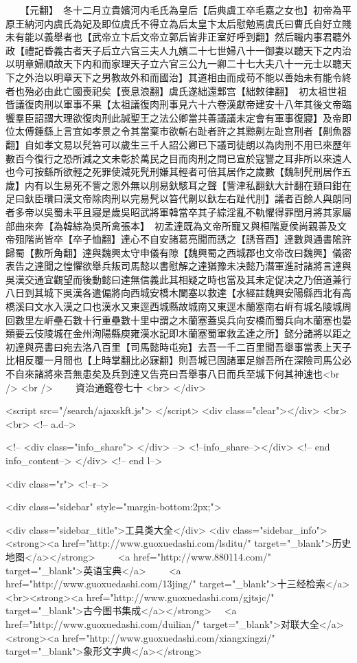 　　【元翻】　冬十二月立貴嬪河内毛氏為皇后【后典虞工卒毛嘉之女也】初帝為平原王納河内虞氏為妃及即位虞氏不得立為后太皇卞太后慰勉焉虞氏曰曹氏自好立賤未有能以義舉者也【武帝立卞后文帝立郭后皆非正室好呼到翻】然后職内事君聽外政【禮記昏義古者天子后立六宫三夫人九嬪二十七世婦八十一御妻以聽天下之内治以明章婦順故天下内和而家理天子立六官三公九一卿二十七大夫八十一元士以聽天下之外治以明章天下之男教故外和而國治】其道相由而成苟不能以善始未有能令終者也殆必由此亡國喪祀矣【喪息浪翻】虞氏遂絀還鄴宫【絀敕律翻】　初太祖世祖皆議復肉刑以軍事不果【太祖議復肉刑事見六十六卷漢獻帝建安十八年其後文帝臨饗羣臣詔謂大理欲復肉刑此誠聖王之法公卿當共善議議未定會有軍事復寢】及帝即位太傅鍾繇上言宜如孝景之令其當棄市欲斬右趾者許之其黥劓左趾宫刑者【劓魚器翻】自如孝文易以髠笞可以歲生三千人詔公卿已下議司徒朗以為肉刑不用已來歷年數百今復行之恐所減之文未彰於萬民之目而肉刑之問已宣於寇讐之耳非所以來遠人也今可按繇所欲輕之死罪使減死髠刑嫌其輕者可倍其居作之歲數【魏制髠刑居作五歲】内有以生易死不訾之恩外無以刖易釱駭耳之聲【訾津私翻釱大計翻在頸曰鉗在足曰釱臣瓚曰漢文帝除肉刑以完易髠以笞代劓以釱左右趾代刖】議者百餘人與朗同者多帝以吳蜀未平且寢是歲吳昭武將軍韓當卒其子綜淫亂不軌懼得罪閏月將其家屬部曲來奔【為韓綜為吳所禽張本】　初孟達既為文帝所寵又與桓階夏侯尚親善及文帝殂階尚皆卒【卒子恤翻】達心不自安諸葛亮聞而誘之【誘音酉】達數與通書隂許歸蜀【數所角翻】達與魏興太守申儀有隙【魏興蜀之西城郡也文帝改曰魏興】儀密表告之達聞之惶懼欲舉兵叛司馬懿以書慰解之達猶豫未决懿乃潛軍進討諸將言達與吳漢交通宜觀望而後動懿曰達無信義此其相疑之時也當及其未定促决之乃倍道兼行八日到其城下吳漢各遣偏將向西城安橋木闌塞以救達【水經註魏興安陽縣西北有高橋溪曰文水入漢之口也漢水又東逕西城縣故城南又東逕木蘭塞南右㟁有城名陵城周回數里左㟁壘石數十行重壘數十里中謂之木蘭塞蓋吳兵向安橋而蜀兵向木蘭塞也晏類要云伎陵城在金州洵陽縣庾雍漢水記即木蘭塞蜀軍救孟達之所】懿分諸將以距之初達與亮書曰宛去洛八百里【司馬懿時屯宛】去吾一千二百里聞吾舉事當表上天子比相反覆一月間也【上時掌翻比必寐翻】則吾城已固諸軍足辦吾所在深險司馬公必不自來諸將來吾無患矣及兵到達又告亮曰吾舉事八日而兵至城下何其神速也<br />
<br />
　　資治通鑑卷七十  <br>
   </div> 

<script src="/search/ajaxskft.js"> </script>
 <div class="clear"></div>
<br>
<br>
 <!-- a.d-->

 <!--
<div class="info_share">
</div> 
-->
 <!--info_share--></div>   <!-- end info_content-->
  </div> <!-- end l-->

<div class="r">   <!--r-->



<div class="sidebar"  style="margin-bottom:2px;">

 
<div class="sidebar_title">工具类大全</div>
<div class="sidebar_info">
<strong><a href="http://www.guoxuedashi.com/lsditu/" target="_blank">历史地图</a></strong>　　
<a href="http://www.880114.com/" target="_blank">英语宝典</a>　　
<a href="http://www.guoxuedashi.com/13jing/" target="_blank">十三经检索</a>　
<br><strong><a href="http://www.guoxuedashi.com/gjtsjc/" target="_blank">古今图书集成</a></strong>　
<a href="http://www.guoxuedashi.com/duilian/" target="_blank">对联大全</a>　<strong><a href="http://www.guoxuedashi.com/xiangxingzi/" target="_blank">象形文字典</a></strong>　

